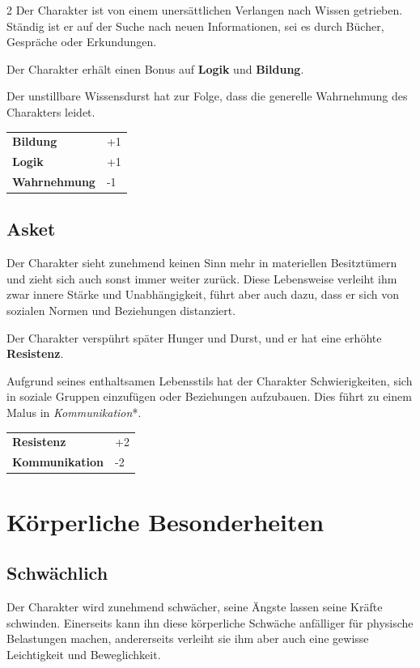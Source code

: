 \begin{multicols}{2}
    Der Charakter ist von einem unersättlichen Verlangen nach Wissen getrieben. Ständig ist er auf der Suche nach neuen Informationen, sei es durch Bücher, Gespräche oder Erkundungen.

    Der Charakter erhält einen Bonus auf \textbf{Logik} und \textbf{Bildung}.

    Der unstillbare Wissensdurst hat zur Folge, dass die generelle Wahrnehmung des Charakters leidet.

    \begin{tabular}{@{}ll@{}}
        \textbf{Bildung} & +1\\
        \textbf{Logik} & +1\\
        \textbf{Wahrnehmung} & -1\\
    \end{tabular}

    \subsection*{Asket}

    Der Charakter sieht zunehmend keinen Sinn mehr in materiellen Besitztümern und zieht sich auch sonst immer weiter zurück. Diese Lebensweise verleiht ihm zwar innere Stärke und Unabhängigkeit, führt aber auch dazu, dass er sich von sozialen Normen und Beziehungen distanziert.

    Der Charakter verspührt später Hunger und Durst, und er hat eine erhöhte \textbf{Resistenz}.

    Aufgrund seines enthaltsamen Lebensstils hat der Charakter Schwierigkeiten, sich in soziale Gruppen einzufügen oder Beziehungen aufzubauen. Dies führt zu einem Malus in \textit{Kommunikation}*.

    \begin{tabular}{@{}ll@{}}
        \textbf{Resistenz} & +2\\
        \textbf{Kommunikation} & -2\\
    \end{tabular}

    \section{Körperliche Besonderheiten}

    \subsection*{Schwächlich}

    Der Charakter wird zunehmend schwächer, seine Ängste lassen seine Kräfte schwinden. Einerseits kann ihn diese körperliche Schwäche anfälliger für physische Belastungen machen, andererseits verleiht sie ihm aber auch eine gewisse Leichtigkeit und Beweglichkeit.


\end{multicols}
